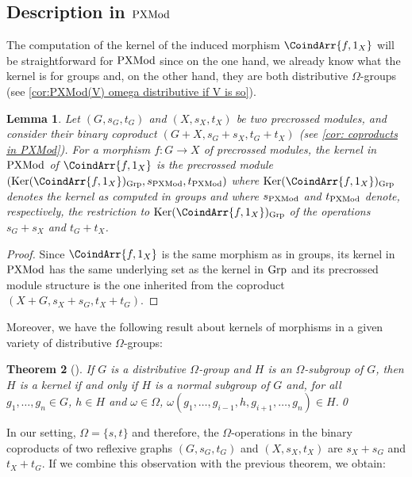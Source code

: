 \documentclass[a4paper, british, reqno]{amsart}
\newcommand{\noproof}{\qed}
\DeclareMathOperator{\Ker}{Ker} %
\renewcommand*{\and}{,}
\renewcommand*{\and}{,}
\newcommand*{\CatName}[1]{\textnormal{#1}}
\newcommand*{\Grp}{\CatName{Grp}}
\newcommand*{\PXMod}{\CatName{PXMod}}
\newtheorem{theorem}{Theorem}[section]
\newtheorem{lemma}[theorem]{Lemma}
\theoremstyle{definition}
\theoremstyle{remark}
\begin{document}
\subsection{Description in \texorpdfstring{\(\PXMod\)}{PXMod}}
\label{subsec - kernels in PXMod and XMod}
The computation of the kernel of the induced morphism \(\CoindArr{f\and 1_X}\) will be straightforward for \(\PXMod\) since on the one hand, we already know what the kernel is for groups and, on the other hand, they are both distributive \(\Omega\)-groups (see \cref{cor:PXMod(V) omega distributive if V is so}).

\begin{lemma}
	\label{lemma: kernel in PXMod}
	Let \((G,s_G,t_G)\) and \((X,s_X,t_X)\) be two precrossed modules, and consider their binary coproduct \((G+X,s_G+s_X,t_G+t_X)\) (see \cref{cor: coproducts in PXMod}). For a morphism \(f\colon G\to X\) of precrossed modules, the kernel in \(\PXMod\) of \(\CoindArr{f\and 1_X}\) is the precrossed module \((\Ker(\CoindArr{f\and 1_X})_\Grp, s_{\PXMod}, t_{\PXMod})\) where \(\Ker(\CoindArr{f\and 1_X})_\Grp\) denotes the kernel as computed in groups and where \(s_{\PXMod}\) and \(t_{\PXMod}\) denote, respectively, the restriction to \(\Ker(\CoindArr{f\and 1_X})_\Grp\) of the operations \(s_G+s_X\) and \(t_G+t_X\).
\end{lemma}

\begin{proof}
	Since \(\CoindArr{f\and 1_X}\) is the same morphism as in groups, its kernel in \(\PXMod\) has the same underlying set as the kernel in \(\Grp\) and its precrossed module structure is the one inherited from the coproduct \((X+G,s_X+s_G,t_X+t_G)\).
\end{proof}

Moreover, we have the following result about kernels of morphisms in a given variety of distributive \(\Omega\)-groups:
\begin{theorem}[\cite{Hig56}]
	\label{thm - Higgins kernel distributive omega groups}
	If \(G\) is a distributive \(\Omega\)-group and \(H\) is an \(\Omega\)-subgroup of \(G\), then \(H\) is a kernel if and only if \(H\) is a normal subgroup of \(G\) and, for all \(g_1,\dots, g_n\in G\), \(h\in H\) and \(\omega\in \Omega\), \(\omega(g_1,\dots, g_{i-1}, h, g_{i+1},\dots, g_n)\in H\).\noproof
\end{theorem}

In our setting, \(\Omega=\{s,t\}\) and therefore, the \(\Omega\)-operations in the binary coproducts of two reflexive graphs \((G,s_G,t_G)\) and \((X,s_X,t_X)\) are \(s_X+s_G\) and \(t_X+t_G\). If we combine this observation with the previous theorem, we obtain:
\end{document}
